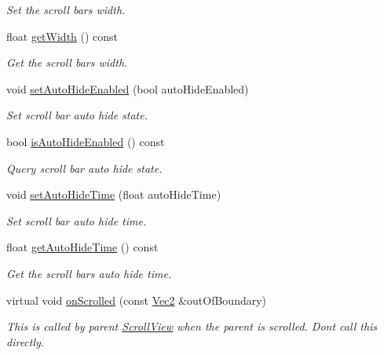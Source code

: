 \begin{DoxyCompactItemize}
\begin{DoxyCompactList}\small\item\em Set the scroll bar\textquotesingle{}s width. \end{DoxyCompactList}\item 
float \hyperlink{classui_1_1ScrollViewBar_a9c5b59742146bf64bc2b3ca2e0c0b5f0}{get\+Width} () const
\begin{DoxyCompactList}\small\item\em Get the scroll bar\textquotesingle{}s width. \end{DoxyCompactList}\item 
void \hyperlink{classui_1_1ScrollViewBar_ab46804801caf07a301c0b94c43b05313}{set\+Auto\+Hide\+Enabled} (bool auto\+Hide\+Enabled)
\begin{DoxyCompactList}\small\item\em Set scroll bar auto hide state. \end{DoxyCompactList}\item 
bool \hyperlink{classui_1_1ScrollViewBar_a23ca5a96001bc47c61f8d4b382ff8d02}{is\+Auto\+Hide\+Enabled} () const
\begin{DoxyCompactList}\small\item\em Query scroll bar auto hide state. \end{DoxyCompactList}\item 
void \hyperlink{classui_1_1ScrollViewBar_a98512e5a256ba825ed8d0b2c8a5905c9}{set\+Auto\+Hide\+Time} (float auto\+Hide\+Time)
\begin{DoxyCompactList}\small\item\em Set scroll bar auto hide time. \end{DoxyCompactList}\item 
float \hyperlink{classui_1_1ScrollViewBar_ac1fcff0b4e6907a3db3c5bfab513fa07}{get\+Auto\+Hide\+Time} () const
\begin{DoxyCompactList}\small\item\em Get the scroll bar\textquotesingle{}s auto hide time. \end{DoxyCompactList}\item 
virtual void \hyperlink{classui_1_1ScrollViewBar_af2d1be8e9fa57dac40a8eaac5e05c3f0}{on\+Scrolled} (const \hyperlink{classVec2}{Vec2} \&out\+Of\+Boundary)
\begin{DoxyCompactList}\small\item\em This is called by parent \hyperlink{classui_1_1ScrollView}{Scroll\+View} when the parent is scrolled. Don\textquotesingle{}t call this directly. \end{DoxyCompactList}\item 

\end{DoxyCompactItemize}
